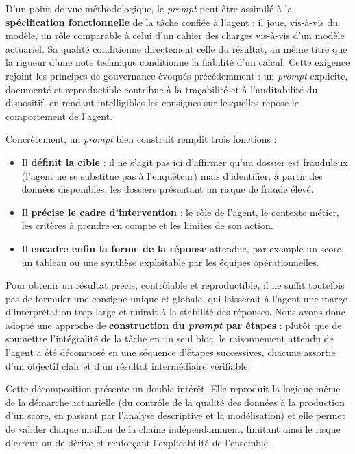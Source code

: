D'un point de vue méthodologique, le \textit{prompt} peut être assimilé à la \textbf{spécification fonctionnelle} de la tâche confiée à l'agent : il joue, vis-à-vis du modèle, un rôle comparable à celui d'un cahier des charges vis-à-vis d'un modèle actuariel. Sa qualité conditionne directement celle du résultat, au même titre que la rigueur d'une note technique conditionne la fiabilité d'un calcul. Cette exigence rejoint les principes de gouvernance évoqués précédemment : un \textit{prompt} explicite, documenté et reproductible contribue à la traçabilité et à l'auditabilité du dispositif, en rendant intelligibles les consignes sur lesquelles repose le comportement de l'agent.

Concrètement, un \textit{prompt} bien construit remplit trois fonctions :

\begin{itemize}
    \item[$\bullet$] Il \textbf{définit la cible} : il ne s'agit pas ici d'affirmer qu'un dossier est frauduleux (l'agent ne se substitue pas à l'enquêteur) mais d'identifier, à partir des données disponibles, les dossiers présentant un risque de fraude élevé.
    \item[$\bullet$] Il \textbf{précise le cadre d'intervention} : le rôle de l'agent, le contexte métier, les critères à prendre en compte et les limites de son action.
    \item[$\bullet$] Il \textbf{encadre enfin la forme de la réponse} attendue, par exemple un score, un tableau ou une synthèse exploitable par les équipes opérationnelles.
\end{itemize}

Pour obtenir un résultat précis, contrôlable et reproductible, il ne suffit toutefois pas de formuler une consigne unique et globale, qui laisserait à l'agent une marge d'interprétation trop large et nuirait à la stabilité des réponses. Nous avons donc adopté une approche de \textbf{construction du \textit{prompt} par étapes} : plutôt que de soumettre l'intégralité de la tâche en un seul bloc, le raisonnement attendu de l'agent a été décomposé en une séquence d'étapes successives, chacune assortie d'un objectif clair et d'un résultat intermédiaire vérifiable.

Cette décomposition présente un double intérêt. Elle reproduit la logique même de la démarche actuarielle (du contrôle de la qualité des données à la production d'un score, en passant par l'analyse descriptive et la modélisation) et elle permet de valider chaque maillon de la chaîne indépendamment, limitant ainsi le risque d'erreur ou de dérive et renforçant l'explicabilité de l'ensemble.


